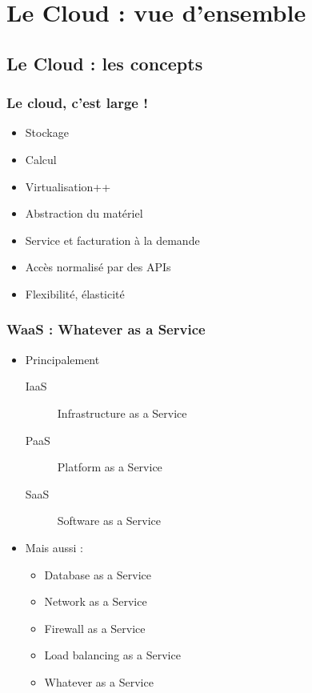   \section[Cloud]{Le Cloud : vue d'ensemble}

  \subsection[Cloud]{Le Cloud : les concepts}

  \begin{frame}
    \frametitle{Le cloud, c'est large !}
    \begin{itemize}
      \item Stockage 
      \item Calcul 
      \item Virtualisation++
      \item Abstraction du matériel
      \item Service et facturation à la demande
      \item \alert<8->{Accès normalisé par des APIs}
      \item \alert<9->{Flexibilité, élasticité}
    \end{itemize}
  \end{frame}

  \begin{frame}
    \frametitle{WaaS : Whatever as a Service}
    \begin{itemize}
      \item Principalement
      \begin{description}
        \item[IaaS] \alert<5->{Infrastructure as a Service}
        \item[PaaS] Platform as a Service
        \item[SaaS] Software as a Service
      \end{description}
      
      \item Mais aussi :
      
      \begin{itemize}
        \item Database as a Service
        \item Network as a Service
        \item Firewall as a Service
        \item Load balancing as a Service
        \item Whatever as a Service
      \end{itemize}
    \end{itemize}
  \end{frame}

